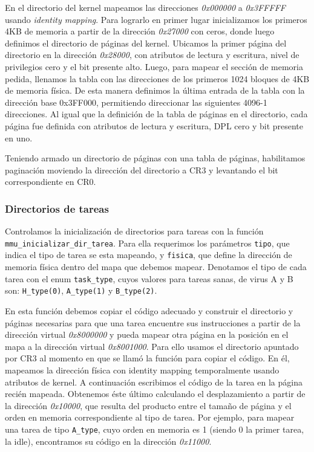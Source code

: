 En el directorio del kernel mapeamos las direcciones \textit{0x000000} a \textit{0x3FFFFF} usando \textit{identity mapping}.
Para lograrlo en primer lugar inicializamos los primeros 4KB de memoria a partir de la dirección \textit{0x27000} con ceros, donde luego definimos el directorio de páginas del kernel.
Ubicamos la primer página del directorio en la dirección \textit{0x28000}, con atributos de lectura y escritura, nivel de privilegios cero y el bit presente alto.
Luego, para mapear el sección de memoria pedida, llenamos la tabla con las direcciones de los primeros 1024 bloques de 4KB de memoria física. 
De esta manera definimos la última entrada de la tabla con la dirección base 0x3FF000, permitiendo direccionar las siguientes 4096-1 direcciones. 
Al igual que la definición de la tabla de páginas en el directorio, cada página fue definida con atributos de lectura y escritura, DPL cero y bit presente en uno.

Teniendo armado un directorio de páginas con una tabla de páginas, habilitamos paginación moviendo la dirección del directorio a CR3 y levantando el bit correspondiente en CR0.\\

\newpage

\subsubsection{Directorios de tareas}
\label{sec-paginacion-tareas} 
Controlamos la inicialización de directorios para tareas con la función \verb|mmu_inicializar_dir_tarea|. 
Para ella requerimos los parámetros \verb|tipo|, que indica el tipo de tarea se esta mapeando, y \verb|fisica|, que define la dirección de memoria física dentro del mapa que debemos mapear. 
Denotamos el tipo de cada tarea con el enum \verb|task_type|, cuyos valores para tareas sanas, de virus A y B son: \verb|H_type(0)|, \verb|A_type(1)| y \verb|B_type(2)|.

En esta función debemos copiar el código adecuado y construir el directorio y páginas necesarias para que una tarea encuentre sus instrucciones a partir de la dirección virtual \textit{0x8000000} y pueda mapear otra página en la posición en el mapa a la dirección virtual \textit{0x8001000}.
Para ello usamos el directorio apuntado por CR3 al momento en que se llamó la función para copiar el código. En él, mapeamos la dirección física con identity mapping temporalmente usando atributos de kernel. A continuación escribimos el código de la tarea en la página recién mapeada.
Obtenemos éste último calculando el desplazamiento a partir de la dirección \textit{0x10000}, que resulta del producto entre el tamaño de página y el orden en memoria correspondiente al tipo de tarea. Por ejemplo, para mapear una tarea de tipo \verb|A_type|, cuyo orden en memoria es 1 (siendo 0 la primer tarea, la idle), encontramos su código en la dirección \textit{0x11000}.

